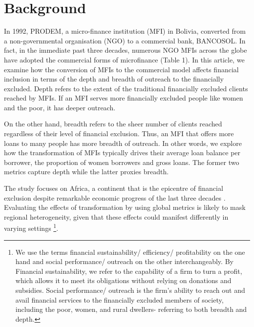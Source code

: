 \documentclass[a4paper,nobind]{templates/ociamthesis}
\begin{document}
\newpage

\hypertarget{background}{%
\section{\texorpdfstring{\textbf{Background}}{Background}}\label{background}}

In 1992, PRODEM, a micro-finance institution (MFI) in Bolivia, converted from a non-governmental organisation (NGO) to a commercial bank, BANCOSOL. In fact, in the immediate past three decades, numerous NGO MFIs across the globe have adopted the commercial forms of microfinance (Table 1). In this article, we examine how the conversion of MFIs to the commercial model affects financial inclusion in terms of the depth and breadth of outreach to the financially excluded. Depth refers to the extent of the traditional financially excluded clients reached by MFIs. If an MFI serves more financially excluded people like women and the poor, it has deeper outreach.

On the other hand, breadth refers to the sheer number of clients reached regardless of their level of financial exclusion. Thus, an MFI that offers more loans to many people has more breadth of outreach. In other words, we explore how the transformation of MFIs typically drives their average loan balance per borrower, the proportion of women borrowers and gross loans. The former two metrics capture depth while the latter proxies breadth.

The study focuses on Africa, a continent that is the epicentre of financial exclusion despite remarkable economic progress of the last three decades \autocite{beck2014sme,allen2011african}. Evaluating the effects of transformation by using global metrics is likely to mask regional heterogeneity, given that these effects could manifest differently in varying settings \autocite{d2017ngos,d2013unsubsidized} \footnote{We use the terms financial sustainability/ efficiency/ profitability on the one hand and social performance/ outreach on the other interchangeably. By Financial sustainability, we refer to the capability of a firm to turn a profit, which allows it to meet its obligations without relying on donations and subsidies. Social performance/ outreach is the firm's ability to reach out and avail financial services to the financially excluded members of society, including the poor, women, and rural dwellers- referring to both breadth and depth.}.
\end{document}
